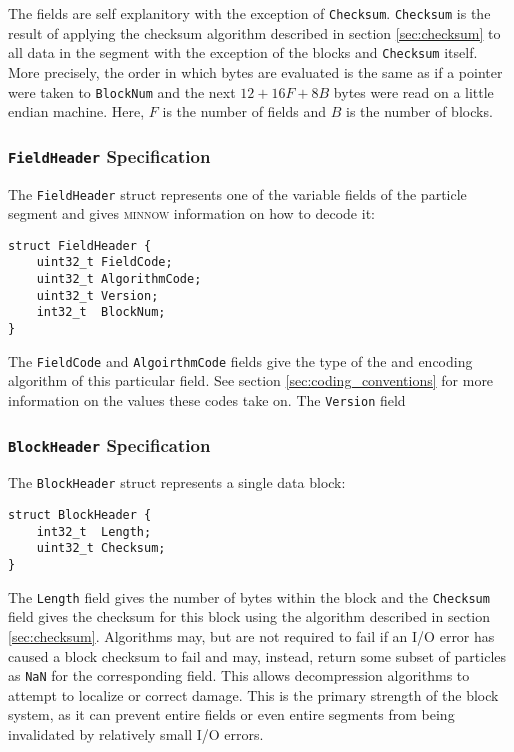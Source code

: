 \documentclass[numberedappendix,apj]{emulateapj}
\begin{document}
The fields are self explanitory with the exception of \texttt{Checksum}.
\texttt{Checksum} is the result of applying the checksum algorithm described in
section \ref{sec:checksum} to all data in the segment with the exception of
the blocks and \texttt{Checksum} itself. More precisely, the order in which
bytes are evaluated is the same as if a pointer were taken to \texttt{BlockNum}
and the next $12 + 16F + 8B$ bytes were read on a little endian machine. Here,
$F$ is the number of fields and $B$ is the number of blocks.

\subsubsection{\texttt{FieldHeader} Specification}

The \texttt{FieldHeader} struct represents one of the variable fields of the
particle segment and gives \textsc{minnow} information on how to decode it:

\begin{verbatim}
struct FieldHeader {
    uint32_t FieldCode;
    uint32_t AlgorithmCode;
    uint32_t Version;
    int32_t  BlockNum;
}
\end{verbatim}

The \texttt{FieldCode} and \texttt{AlgoirthmCode} fields give the type of the
and encoding algorithm of this particular field. See section
\ref{sec:coding_conventions} for more information on the values these codes
take on. The \texttt{Version} field

\subsubsection{\texttt{BlockHeader} Specification}

The \texttt{BlockHeader} struct represents a single data block:

\begin{verbatim}
struct BlockHeader {
    int32_t  Length;
    uint32_t Checksum;
}
\end{verbatim}

The \texttt{Length} field gives the number of bytes within the block and the
\texttt{Checksum} field gives the checksum for this block using the algorithm
described in section \ref{sec:checksum}. Algorithms may, but are not required to
fail if an I/O error has caused a block checksum to fail and may, instead,
return some subset of particles as \texttt{NaN} for the corresponding field.
This allows decompression algorithms to attempt to localize or correct damage.
This is the primary strength of the block system, as it can prevent entire
fields or even entire segments from being invalidated by relatively small
I/O errors.
\end{document}
